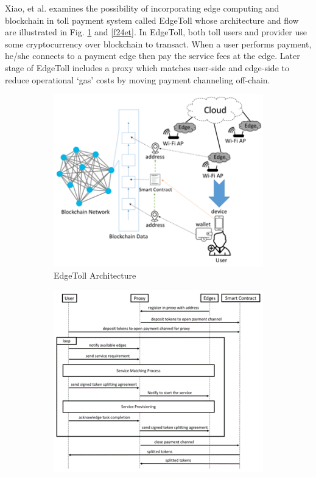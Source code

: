 \documentclass[a4paper,12pt,oneside, utf8x]{report}
\begin{document}
Xiao, et al. \cite{a18} examines the possibility of incorporating edge computing and blockchain in toll payment system called EdgeToll whose architecture and flow are illustrated in Fig. \ref{f23et} and \ref{f24et}. In EdgeToll, both toll users and provider use some cryptocurrency over blockchain to transact. When a user performs payment, he/she connects to a payment edge then pay the service fees at the edge. Later stage of EdgeToll includes a proxy which matches user-side and edge-side to reduce operational ‘gas’ costs by moving payment channeling off-chain.

	\begin{figure}[H]
        \centering
        \begin{subfigure}[b]{.44\textwidth}
            \centering \includegraphics[width=0.99\linewidth]{figures/2-3.png}
            \caption{EdgeToll Architecture \cite{a18}}
            \label{f23et}
        \end{subfigure} 
        \begin{subfigure}[b]{.44\textwidth}
            \centering \includegraphics[width=0.99\linewidth]{figures/2-4.png}

\end{subfigure}
\end{figure}
\end{document}
